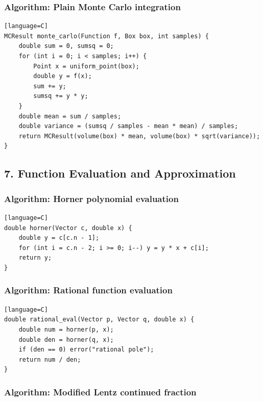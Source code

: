 \documentclass[11pt]{article}
\begin{document}
\subsubsection{Algorithm: Plain Monte Carlo integration}\label{algorithm-plain-monte-carlo-integration}

\begin{verbatim}[language=C]
MCResult monte_carlo(Function f, Box box, int samples) {
    double sum = 0, sumsq = 0;
    for (int i = 0; i < samples; i++) {
        Point x = uniform_point(box);
        double y = f(x);
        sum += y;
        sumsq += y * y;
    }
    double mean = sum / samples;
    double variance = (sumsq / samples - mean * mean) / samples;
    return MCResult(volume(box) * mean, volume(box) * sqrt(variance));
}
\end{verbatim}

\subsection{7. Function Evaluation and Approximation}\label{function-evaluation-and-approximation}

\subsubsection{Algorithm: Horner polynomial evaluation}\label{algorithm-horner-polynomial-evaluation}

\begin{verbatim}[language=C]
double horner(Vector c, double x) {
    double y = c[c.n - 1];
    for (int i = c.n - 2; i >= 0; i--) y = y * x + c[i];
    return y;
}
\end{verbatim}

\subsubsection{Algorithm: Rational function evaluation}\label{algorithm-rational-function-evaluation}

\begin{verbatim}[language=C]
double rational_eval(Vector p, Vector q, double x) {
    double num = horner(p, x);
    double den = horner(q, x);
    if (den == 0) error("rational pole");
    return num / den;
}
\end{verbatim}

\subsubsection{Algorithm: Modified Lentz continued fraction}\label{algorithm-modified-lentz-continued-fraction}
\end{document}
